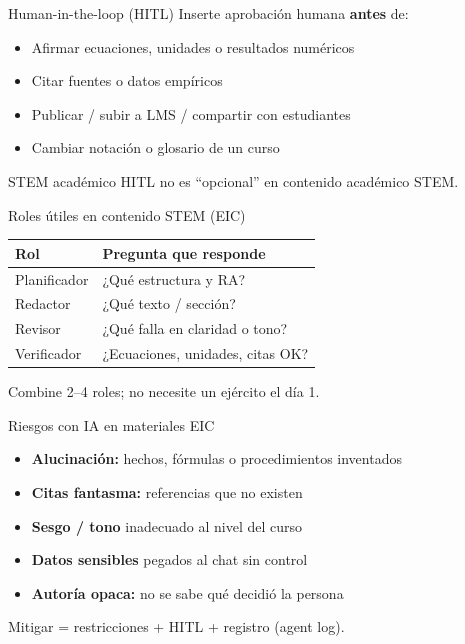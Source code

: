 \documentclass[aspectratio=169,11pt]{beamer}
\begin{document}
\begin{frame}{Human-in-the-loop (HITL)}
Inserte aprobación humana \textbf{antes} de:
\begin{itemize}
\item Afirmar ecuaciones, unidades o resultados numéricos
\item Citar fuentes o datos empíricos
\item Publicar / subir a LMS / compartir con estudiantes
\item Cambiar notación o glosario de un curso
\end{itemize}
\begin{alertblock}{STEM académico}
HITL no es ``opcional'' en contenido académico STEM.
\end{alertblock}
\end{frame}

\begin{frame}{Roles útiles en contenido STEM (EIC)}
\begin{tabularx}{\textwidth}{@{}lX@{}}
\toprule
Rol & Pregunta que responde \\
\midrule
Planificador & ¿Qué estructura y RA? \\
Redactor & ¿Qué texto / sección? \\
Revisor & ¿Qué falla en claridad o tono? \\
Verificador & ¿Ecuaciones, unidades, citas OK? \\
\bottomrule
\end{tabularx}
\vspace{1em}
Combine 2--4 roles; no necesite un ejército el día 1.
\end{frame}

\begin{frame}{Riesgos con IA en materiales EIC}
\begin{itemize}
\item \textbf{Alucinación:} hechos, fórmulas o procedimientos inventados
\item \textbf{Citas fantasma:} referencias que no existen
\item \textbf{Sesgo / tono} inadecuado al nivel del curso
\item \textbf{Datos sensibles} pegados al chat sin control
\item \textbf{Autoría opaca:} no se sabe qué decidió la persona
\end{itemize}
Mitigar = restricciones + HITL + registro (agent log).
\end{frame}
\end{document}
